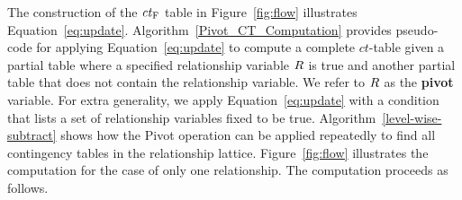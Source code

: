 \documentclass{acm_proc_article-sp}
\newcommand{\ct}{\mathit{ct}}
\begin{document}
The construction of the $\ct_{\false}$ table in Figure~\ref{fig:flow} illustrates Equation~\eqref{eq:update}. Algorithm~\ref{Pivot_CT_Computation} provides pseudo-code for applying Equation~\eqref{eq:update} to compute a complete $\ct$-table given a partial table where a specified relationship variable $R$  is true
and another partial table that does not contain the relationship variable. 
We refer to $R$ as the \textbf{pivot} variable. 
For extra generality, we apply Equation~\eqref{eq:update} with a condition that lists a set of relationship variables fixed to be true.  
Algorithm~\ref{level-wise-subtract} shows how the Pivot operation can be applied repeatedly to find all contingency tables in the relationship lattice. Figure~\ref{fig:flow} illustrates the computation for the case of only one relationship. The computation proceeds as follows. 
\end{document}
